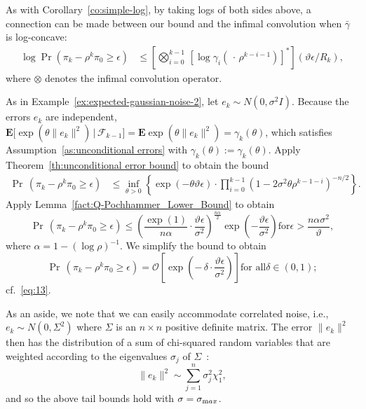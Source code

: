 As with Corollary~\ref{co:simple-log}, by taking logs of both sides
above, a connection can be made between our bound and the infimal
convolution when $\bar{\gamma}$ is log-concave:
\begin{align*}
\log \Pr(\pi_k-\rho^{k}\pi_{0}\ge\epsilon) & \le 
  \left[\bigotimes_{i=0}^{k-1}\, [\log\gamma_{i}(\,\cdot\,\rho^{k-i-1})]^{*}
  \right](\vartheta\epsilon/R_{k}),
\end{align*}
where $\otimes$ denotes the infimal convolution operator.

\begin{example}\label{ex:ex-gaussian-noise-3}
  As in Example~\ref{ex:expected-gaussian-noise-2}, let $e_k\sim
  N(0,\sigma^2 I)$. Because the errors $e_k$ are independent,
  $\mathbf{E}\big[\exp(\theta\|e_k\|^2)\,|\,\mathcal{F}_{k-1}\big]=\mathbf{E}\exp(\theta\|e_k\|^2)=\gamma_k(\theta)$,
  which satisfies Assumption~\ref{as:unconditional errors} with
  $\gamma_k(\theta):= \gamma_k(\theta)$. Apply
  Theorem~\ref{th:unconditional error bound} to obtain the bound
  \begin{align}\label{eq:12}
    \Pr \, ( 
    \pi_k-\rho^k\pi_{0}
      \geq\epsilon
      )
    &\leq
    \inf_{\theta>0}
    \left\{
      \exp(-\theta \vartheta \epsilon) \cdot 
      \prod_{i=0}^{k-1}(1-2\sigma^2\theta\rho^{k-1-i})^{-n/2}\right\}.
  \end{align}
Apply Lemma~\ref{fact:Q-Pochhammer_Lower_Bound} to obtain
\[
  \Pr\,
  (
    \pi_k-\rho^k\pi_{0}
      \geq\epsilon
  )
  \overset{}{\leq}
  \left(
    \frac{\exp(1)}{n\alpha}\cdot\frac{ \vartheta \epsilon }{\sigma^2}
  \right)
  ^{\tfrac{n\alpha}{2}} \!\!
  \exp
  \left(
    -\frac{\vartheta\epsilon}{\sigma^2}
  \right)
  \text{for} 
  \epsilon > \frac{n\alpha\sigma^2}{\vartheta},
\]
where $\alpha=1-(\log\rho)^{-1}.$ We simplify the bound to obtain
  \begin{equation}\label{eq:14}
  \Pr\,(\pi_k-\rho^k\pi_0\ge \epsilon) =
  \mathcal{O}\left[\exp\left(- \,\delta\cdot \frac{\vartheta\epsilon}{\sigma^{2}}\right)\right] \text{for all} \mbox{$\delta\in(0,1)$};
  \end{equation}
cf.~\eqref{eq:13}.

As an aside, we note that we can easily accommodate correlated noise,
i.e., $e_k\sim N(0,\Sigma^{2})$ where $\Sigma$ is an $n\times n$ positive
definite matrix. The error $\|e_k\|^2$ then has the
distribution of a sum of chi-squared random variables that are
weighted according to the eigenvalues $\sigma_j$ of
$\Sigma$~\cite{imhof:1961}:
  \[
  \|e_k\|^2 \sim \sum_{j=1}^{n}\sigma_{j}^{2}\chi_1^2,
  \]
  and so the above tail bounds hold with $\sigma=\sigma_{\text max}$.
\end{example}{

}
